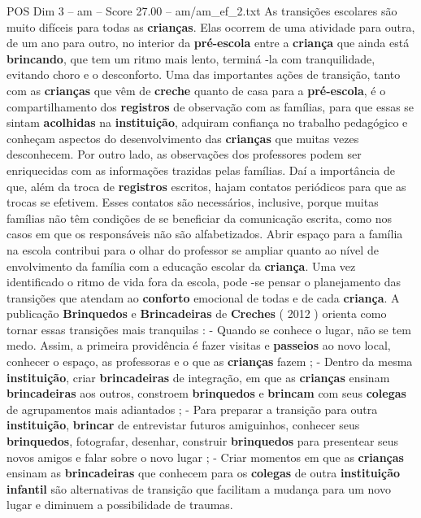 \begin{textsample}{POS Dim 3 – am – Score 27.00 – am/am\_ef\_2.txt}
As transições escolares são muito difíceis para todas as \textbf{crianças}.
Elas ocorrem de uma atividade para outra, de um ano para outro, no interior da \textbf{pré-escola} entre a \textbf{criança} que ainda está \textbf{brincando}, que tem um ritmo mais lento, terminá -la com tranquilidade, evitando choro e o desconforto.
Uma das importantes ações de transição, tanto com as \textbf{crianças} que vêm de \textbf{creche} quanto de casa para a \textbf{pré-escola}, é o compartilhamento dos \textbf{registros} de observação com as famílias, para que essas se sintam \textbf{acolhidas} na \textbf{instituição}, adquiram confiança no trabalho pedagógico e conheçam aspectos do desenvolvimento das \textbf{crianças} que muitas vezes desconhecem.
Por outro lado, as observações dos professores podem ser enriquecidas com as informações trazidas pelas famílias.
Daí a importância de que, além da troca de \textbf{registros} escritos, hajam contatos periódicos para que as trocas se efetivem.
Esses contatos são necessários, inclusive, porque muitas famílias não têm condições de se beneficiar da comunicação escrita, como nos casos em que os responsáveis não são alfabetizados.
Abrir espaço para a família na escola contribui para o olhar do professor se ampliar quanto ao nível de envolvimento da família com a educação escolar da \textbf{criança}.
Uma vez identificado o ritmo de vida fora da escola, pode -se pensar o planejamento das transições que atendam ao \textbf{conforto} emocional de todas e de cada \textbf{criança}.
A publicação \textbf{Brinquedos} e \textbf{Brincadeiras} de \textbf{Creches} ( 2012 ) orienta como tornar essas transições mais tranquilas : - Quando se conhece o lugar, não se tem medo.
Assim, a primeira providência é fazer visitas e \textbf{passeios} ao novo local, conhecer o espaço, as professoras e o que as \textbf{crianças} fazem ; - Dentro da mesma \textbf{instituição}, criar \textbf{brincadeiras} de integração, em que as \textbf{crianças} ensinam \textbf{brincadeiras} aos outros, constroem \textbf{brinquedos} e \textbf{brincam} com seus \textbf{colegas} de agrupamentos mais adiantados ; - Para preparar a transição para outra \textbf{instituição}, \textbf{brincar} de entrevistar futuros amiguinhos, conhecer seus \textbf{brinquedos}, fotografar, desenhar, construir \textbf{brinquedos} para presentear seus novos amigos e falar sobre o novo lugar ; - Criar momentos em que as \textbf{crianças} ensinam as \textbf{brincadeiras} que conhecem para os \textbf{colegas} de outra \textbf{instituição} \textbf{infantil} são alternativas de transição que facilitam a mudança para um novo lugar e diminuem a possibilidade de traumas.

\end{textsample}
